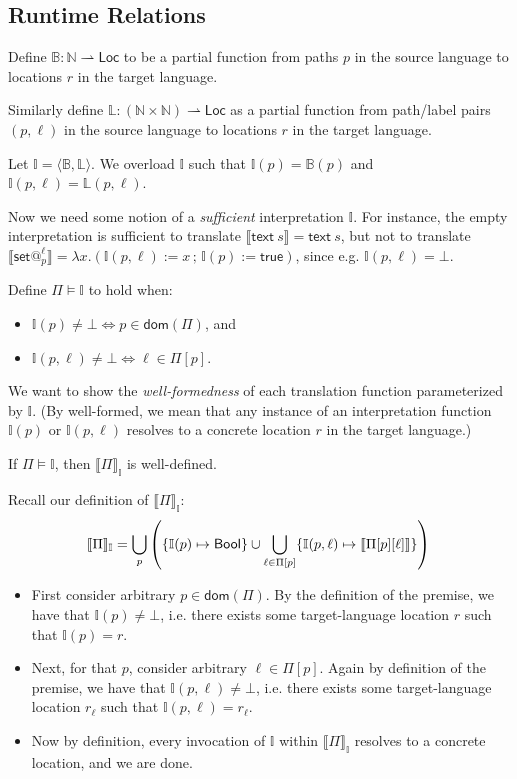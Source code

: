 \documentclass{article}
\makeatletter
\newcommand{\mf}[1]{\mathsf{#1}}
\newcommand{\semi}{\,;\,}
\newcommand{\dom}{\mf{dom}}
\newcommand{\llrr}[1]{\llbracket #1 \rrbracket}
\newcommand{\pair}[2]{\langle #1, #2 \rangle}
\newcommand{\tbool}{\mf{Bool}}
\newcommand{\vtxt}[1]{\mf{text}\ #1}
\newcommand{\vset}[2]{\mf{set}@^{#1}_{#2}}
\newcommand{\I}{\mathbb{I}}
\newcommand{\eset}[2]{#1 := #2}
\makeatother
\begin{document}
\subsection{Runtime Relations}

Define $\mathbb{B}: \mathbb{N} \rightharpoonup \mf{Loc}$ to be a
partial function from paths $p$ in the source language to locations $r$
in the target language.

Similarly define $\mathbb{L}: (\mathbb{N} \times \mathbb{N}) 
\rightharpoonup \mf{Loc}$ as a
partial function from path/label pairs $(p, \ell)$ in the source language 
to locations $r$ in the target language.

Let $\I=\pair{\mathbb{B}}{\mathbb{L}}$.
We overload $\I$ such that
$\I(p)=\mathbb{B}(p)$ and 
$\I(p, \ell)=\mathbb{L}(p, \ell)$.

Now we need some notion of a \emph{sufficient} interpretation $\I$.
For instance, the empty interpretation is sufficient
to translate $\llrr{\vtxt{s}}=\vtxt{s}$, but not to
translate 
$\llrr{\vset{\ell}{p}}=\lambda x.(\eset{\I(p, \ell)}{x} 
\semi \eset{\I(p)}{\mf{true}})$,
since e.g. $\I(p, \ell)=\bot$.

Define $\Pi \vDash \I$ to hold when:
\begin{itemize}
\item $\I(p) \neq \bot \Leftrightarrow p \in \dom(\Pi)$, and
\item $\I(p, \ell) \neq \bot \Leftrightarrow \ell \in \Pi[p]$.
\end{itemize}

We want to show the \emph{well-formedness}
of each translation function parameterized by $\I$.
(By well-formed, we mean that any instance of an
interpretation function $\I(p)$ or $\I(p, \ell)$ resolves to a concrete
location $r$ in the target language.)

\begin{lemma}
If $\Pi \vDash \I$, then $\llrr{\Pi}_\I$ is well-defined.

\begin{Proof}
Recall our definition of $\llrr{\Pi}_\I$:
\[
\llrr{\Pi}_\I = \bigcup_p\left( \{\I(p) \mapsto \tbool\}
\cup \bigcup_{\ell \in \Pi[p]} \{\I(p, \ell) \mapsto \llrr{\Pi[p][\ell]}\}
\right)\\
\]
\begin{itemize}
\item First consider arbitrary $p \in \dom(\Pi)$.
By the definition of the premise, we have that $\I(p) \neq \bot$,
i.e. there exists some target-language location $r$ such that
$\I(p)=r$.
\item Next, for that $p$, consider arbitrary $\ell \in \Pi[p]$.
Again by definition of the premise, we have that
$\I(p, \ell) \neq \bot$, 
i.e. there exists some target-language location $r_\ell$ such that
$\I(p, \ell)=r_\ell$.
\item Now by definition, every invocation of $\I$ within $\llrr{\Pi}_\I$
resolves to a concrete location, and we are done.
\end{itemize}
\end{Proof}
\end{lemma}
\end{document}

